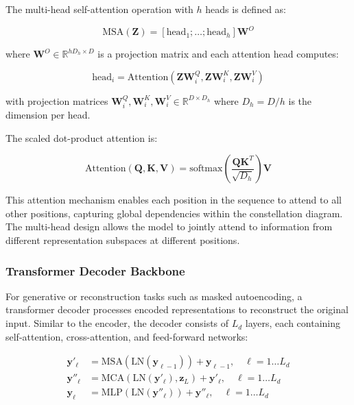 The multi-head self-attention operation with $h$ heads is defined as:

\begin{equation}
\text{MSA}(\mathbf{Z}) = [\text{head}_1; \ldots; \text{head}_h]\mathbf{W}^O
\end{equation}

where $\mathbf{W}^O \in \mathbb{R}^{hD_h \times D}$ is a projection matrix and each attention head computes:

\begin{equation}
\text{head}_i = \text{Attention}(\mathbf{Z}\mathbf{W}^Q_i, \mathbf{Z}\mathbf{W}^K_i, \mathbf{Z}\mathbf{W}^V_i)
\end{equation}

with projection matrices $\mathbf{W}^Q_i, \mathbf{W}^K_i, \mathbf{W}^V_i \in \mathbb{R}^{D \times D_h}$ where $D_h = D/h$ is the dimension per head.

The scaled dot-product attention is:

\begin{equation}
\text{Attention}(\mathbf{Q}, \mathbf{K}, \mathbf{V}) = \text{softmax}\left(\frac{\mathbf{Q}\mathbf{K}^T}{\sqrt{D_h}}\right)\mathbf{V}
\end{equation}

This attention mechanism enables each position in the sequence to attend to all other positions, capturing global dependencies within the constellation diagram. The multi-head design allows the model to jointly attend to information from different representation subspaces at different positions.

\subsubsection{Transformer Decoder Backbone}

For generative or reconstruction tasks such as masked autoencoding, a transformer decoder processes encoded representations to reconstruct the original input. Similar to the encoder, the decoder consists of $L_d$ layers, each containing self-attention, cross-attention, and feed-forward networks:

\begin{align}
\mathbf{y}'_{\ell} &= \text{MSA}(\text{LN}(\mathbf{y}_{\ell-1})) + \mathbf{y}_{\ell-1}, \quad \ell = 1 \ldots L_d\\
\mathbf{y}''_{\ell} &= \text{MCA}(\text{LN}(\mathbf{y}'_{\ell}), \mathbf{z}_L) + \mathbf{y}'_{\ell}, \quad \ell = 1 \ldots L_d\\
\mathbf{y}_{\ell} &= \text{MLP}(\text{LN}(\mathbf{y}''_{\ell})) + \mathbf{y}''_{\ell}, \quad \ell = 1 \ldots L_d
\end{align}


